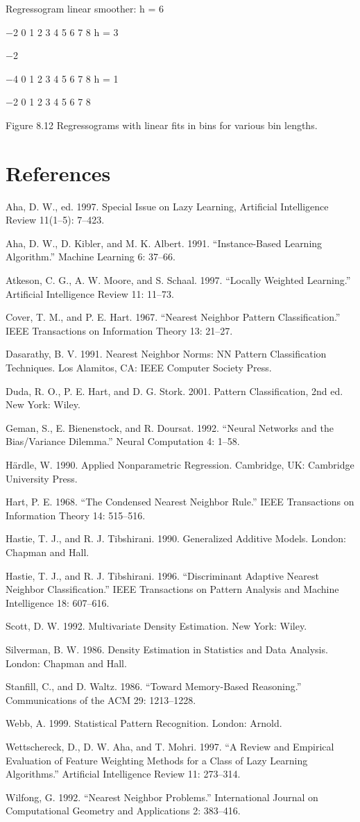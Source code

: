 Regressogram linear smoother: h = 6

$-$2 0 1 2 3 4 5 6 7 8 h = 3

$-$2

$-$4 0 1 2 3 4 5 6 7 8 h = 1

$-$2 0 1 2 3 4 5 6 7 8

Figure 8.12 Regressograms with linear fits in bins for various bin lengths.

\section{References}

Aha, D. W., ed. 1997. Special Issue on Lazy Learning, Artificial Intelligence Review 11(1--5): 7--423.

Aha, D. W., D. Kibler, and M. K. Albert. 1991. “Instance-Based Learning Algorithm.” Machine Learning 6: 37--66.

Atkeson, C. G., A. W. Moore, and S. Schaal. 1997. “Locally Weighted Learning.” Artificial Intelligence Review 11: 11--73.

Cover, T. M., and P. E. Hart. 1967. “Nearest Neighbor Pattern Classification.” IEEE Transactions on Information Theory 13: 21--27.

Dasarathy, B. V. 1991. Nearest Neighbor Norms: NN Pattern Classification Techniques. Los Alamitos, CA: IEEE Computer Society Press.

Duda, R. O., P. E. Hart, and D. G. Stork. 2001. Pattern Classification, 2nd ed. New York: Wiley.

Geman, S., E. Bienenstock, and R. Doursat. 1992. “Neural Networks and the Bias/Variance Dilemma.” Neural Computation 4: 1--58.

Härdle, W. 1990. Applied Nonparametric Regression. Cambridge, UK: Cambridge University Press.

Hart, P. E. 1968. “The Condensed Nearest Neighbor Rule.” IEEE Transactions on Information Theory 14: 515--516.

Hastie, T. J., and R. J. Tibshirani. 1990. Generalized Additive Models. London: Chapman and Hall.

Hastie, T. J., and R. J. Tibshirani. 1996. “Discriminant Adaptive Nearest Neighbor Classification.” IEEE Transactions on Pattern Analysis and Machine Intelligence 18: 607--616.

Scott, D. W. 1992. Multivariate Density Estimation. New York: Wiley.

Silverman, B. W. 1986. Density Estimation in Statistics and Data Analysis. London: Chapman and Hall.

Stanfill, C., and D. Waltz. 1986. “Toward Memory-Based Reasoning.” Communications of the ACM 29: 1213--1228.

Webb, A. 1999. Statistical Pattern Recognition. London: Arnold.

Wettschereck, D., D. W. Aha, and T. Mohri. 1997. “A Review and Empirical Evaluation of Feature Weighting Methods for a Class of Lazy Learning Algorithms.” Artificial Intelligence Review 11: 273--314.

Wilfong, G. 1992. “Nearest Neighbor Problems.” International Journal on Computational Geometry and Applications 2: 383--416.

